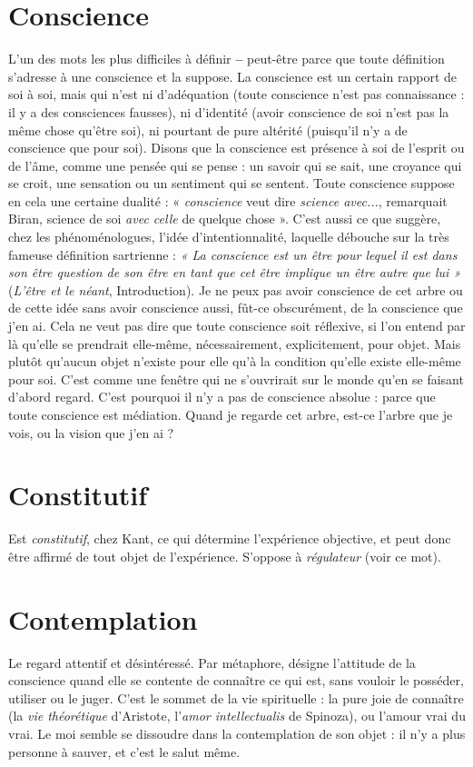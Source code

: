 \section{Conscience}
L’un des mots les plus difficiles à définir {\bf --} peut-être parce
que toute définition s'adresse à une conscience et la suppose.
La conscience est un certain rapport de soi à soi, mais qui n’est ni d’adéquation
(toute conscience n’est pas connaissance : il y a des consciences fausses), ni
d'identité (avoir conscience de soi n’est pas la même chose qu'être soi), ni pourtant
de pure altérité (puisqu'il n’y a de conscience que pour soi). Disons que la
conscience est présence à soi de l'esprit ou de l’âme, comme une pensée qui se
pense : un savoir qui se sait, une croyance qui se croit, une sensation ou un sentiment
qui se sentent. Toute conscience suppose en cela une certaine dualité :
« {\it conscience} veut dire {\it science avec...}, remarquait Biran, science de soi {\it avec celle}
de quelque chose ». C’est aussi ce que suggère, chez les phénoménologues,
l’idée d’intentionnalité, laquelle débouche sur la très fameuse définition
sartrienne : {\it « La conscience est un être pour lequel il est dans son être question de
son être en tant que cet être implique un être autre que lui »} ({\it L'être et le néant},
Introduction). Je ne peux pas avoir conscience de cet arbre ou de cette idée sans
avoir conscience aussi, fût-ce obscurément, de la conscience que j’en ai. Cela ne
veut pas dire que toute conscience soit réflexive, si l’on entend par là qu’elle se
prendrait elle-même, nécessairement, explicitement, pour objet. Mais plutôt
qu'aucun objet n’existe pour elle qu’à la condition qu’elle existe elle-même
pour soi. C’est comme une fenêtre qui ne s’ouvrirait sur le monde qu’en se faisant
d’abord regard. C’est pourquoi il n’y a pas de conscience absolue : parce
que toute conscience est médiation. Quand je regarde cet arbre, est-ce l’arbre
que je vois, ou la vision que j’en ai ?

\section{Constitutif}
Est {\it constitutif}, chez Kant, ce qui détermine l’expérience
objective, et peut donc être affirmé de tout objet de l’expérience.
S’oppose à {\it régulateur} (voir ce mot).

\section{Contemplation}
Le regard attentif et désintéressé. Par métaphore, désigne
l'attitude de la conscience quand elle se contente de
connaître ce qui est, sans vouloir le posséder, utiliser ou le juger. C’est le
sommet de la vie spirituelle : la pure joie de connaître (la {\it vie théorétique} d’Aristote,
l’{\it amor intellectualis} de Spinoza), ou l'amour vrai du vrai. Le moi semble se
dissoudre dans la contemplation de son objet : il n’y a plus personne à sauver,
et c’est le salut même.

